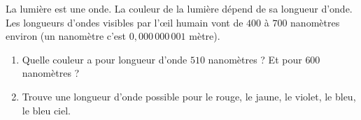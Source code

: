 \documentclass[class=report,crop=false, 12pt]{standalone}
\begin{document}
\newcommand{\hexa}{\text{hex}}





\begin{activite}

%


La lumière est une onde. La couleur de la lumière dépend de 
sa longueur d'onde. Les longueurs d'ondes visibles par l'\oe il humain  vont de $400$ à $700$ nanomètres environ (un nanomètre c'est $0,000 \, 000 \,001$ mètre).


  \begin{enumerate}
    \item Quelle couleur a pour longueur d'onde $510$ nanomètres ? Et pour $600$ nanomètres ?
    
    \item Trouve une longueur d'onde possible pour le rouge, le jaune, le violet, le bleu, le bleu ciel.
    
  \end{enumerate}
  
%  
%  


\end{activite}
\end{document}
